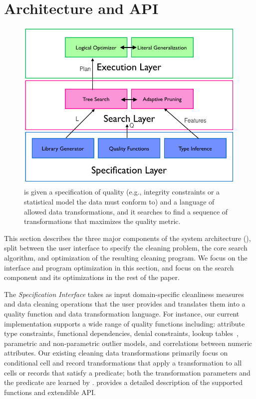 \section{Architecture and API}
\begin{figure}[t]
\centering
 \includegraphics[width=\columnwidth]{figures/alphacleanarch.png}
 \caption{ \sys is given a specification of quality (e.g., integrity constraints or a statistical model the data must conform to) and a language  of  allowed  data  transformations,  and  it  searches  to find a sequence of transformations that maximizes the quality metric. \label{fig:arch} }
\end{figure}


This section describes the three major components of the \sys system architecture (), split between the user interface to specify the cleaning problem, the core search algorithm, and optimization of the resulting cleaning program.  We focus on the interface and program optimization in this section, and focus on the search component and its optimizations in the rest of the paper.

The {\it Specification Interface} takes as input domain-specific cleanliness measures and data cleaning operations that the user provides  and translates them into a quality function and data transformation language.   For instance, our current implementation supports a wide range of quality functions including: attribute type constraints, functional dependencies, denial constraints, lookup tables~\cite{}, parametric and non-parametric outlier models, and correlations between numeric attributes.  Our existing cleaning data transformations primarily focus on conditional cell and record transformations that apply a transformation to all cells or records that satisfy a predicate; both the transformation parameters and the predicate are learned by \sys.   provides a detailed description of the supported functions and extendible API. 

